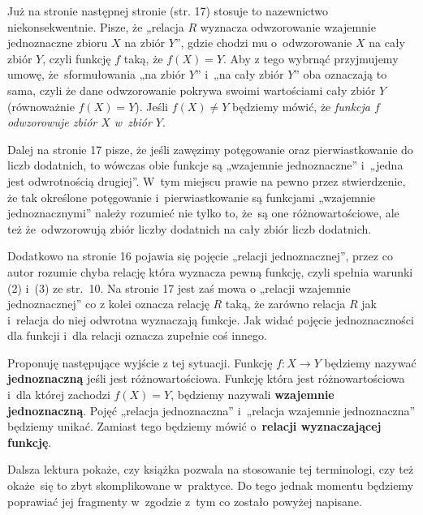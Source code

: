 \documentclass[a4paper,11pt]{article}
\numberwithin{equation}{section}
\begin{document}
Już na stronie następnej stronie (str. 17) stosuje to nazewnictwo
niekonsekwentnie. Pisze, że „relacja $R$ wyznacza odwzorowanie
wzajemnie jednoznaczne zbioru $X$ na zbiór $Y$”, gdzie chodzi mu
o~odwzorowanie $X$ na cały zbiór $Y$, czyli funkcję $f$ taką, że
$f( X ) = Y$. Aby z tego wybrnąć przyjmujemy umowę, że~sformułowania
„na zbiór $Y$” i~„na cały zbiór $Y$” oba oznaczają to sama, czyli że
dane odwzorowanie pokrywa swoimi wartościami cały zbiór $Y$
(równoważnie $f( X ) = Y$). Jeśli $f( X ) \neq Y$ będziemy mówić, że
\textit{funkcja $f$ odwzorowuje zbiór $X$ w~zbiór $Y$}.

Dalej na stronie 17 pisze, że jeśli zawęzimy potęgowanie oraz
pierwiastkowanie do liczb dodatnich, to wówczas obie funkcje są
„wzajemnie jednoznaczne” i~„jedna jest odwrotnością drugiej”. W~tym
miejscu prawie na pewno przez stwierdzenie, że tak określone
potęgowanie i~pierwiastkowanie są funkcjami „wzajemnie jednoznacznymi”
należy rozumieć nie tylko to, że~są one różnowartościowe, ale też
że~odwzorowują zbiór liczby dodatnich na cały zbiór liczb dodatnich.

Dodatkowo na stronie 16 pojawia się pojęcie „relacji jednoznacznej”,
przez co autor rozumie chyba relację która wyznacza pewną funkcję,
czyli spełnia warunki (2) i~(3) ze str.~10. Na stronie 17 jest zaś
mowa o „relacji wzajemnie jednoznacznej” co z kolei oznacza relację
$R$ taką, że zarówno relacja $R$ jak i~relacja do niej odwrotna
wyznaczają funkcje. Jak widać pojęcie jednoznaczności dla funkcji
i~dla relacji oznacza zupełnie coś innego.

Proponuję następujące wyjście z tej sytuacji. Funkcję $f: X \to Y$
będziemy nazywać \textbf{jednoznaczną} jeśli jest różnowartościowa.
Funkcję która jest różnowartościowa i~dla której zachodzi
$f( X ) = Y$, będziemy nazywali \textbf{wzajemnie jednoznaczną}. Pojęć
„relacja jednoznaczna” i~„relacja wzajemnie jednoznaczna” będziemy
unikać. Zamiast tego będziemy mówić o~\textbf{relacji wyznaczającej funkcję}.

Dalsza lektura pokaże, czy książka pozwala na stosowanie tej
terminologi, czy też okaże~się to zbyt skomplikowane w~praktyce. Do
tego jednak momentu będziemy poprawiać jej fragmenty w~zgodzie z~tym
co zostało powyżej napisane.






\newpage

\end{document}
